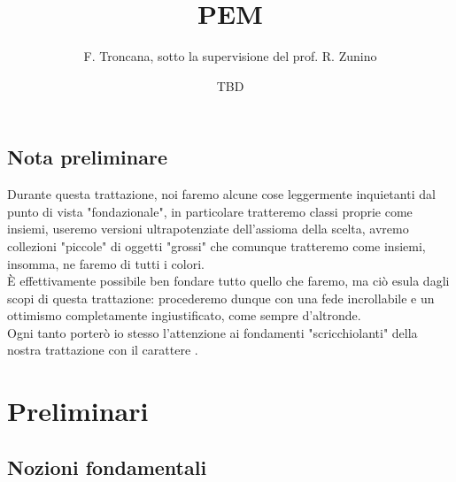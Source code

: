 \documentclass{article}
\title{PEM}
\author{F. Troncana, sotto la supervisione del prof. R. Zunino}
\date{TBD}
\begin{document}
\maketitle

\subsection*{Nota preliminare}

Durante questa trattazione, noi faremo alcune cose leggermente inquietanti dal punto di vista "fondazionale", in particolare tratteremo classi proprie come insiemi, useremo versioni ultrapotenziate dell'assioma della scelta, avremo collezioni "piccole" di oggetti "grossi" che comunque tratteremo come insiemi, insomma, ne faremo di tutti i colori.\\
È effettivamente possibile ben fondare tutto quello che faremo, ma ciò esula dagli scopi di questa trattazione: procederemo dunque con una fede incrollabile e un ottimismo completamente ingiustificato, come sempre d'altronde.\\
Ogni tanto porterò io stesso l'attenzione ai fondamenti "scricchiolanti" della nostra trattazione con il carattere \PHcat.

\section{Preliminari}

\subsection{Nozioni fondamentali}
\end{document}
